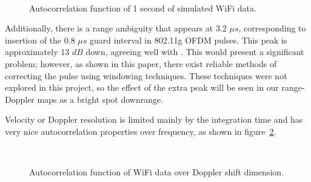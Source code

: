 \documentclass[article,11pt,onecolumn,final]{IEEEtran}
\begin{document}
\begin{figure}
	\caption{Autocorrelation function of 1 second of simulated WiFi data.}
	\centering
	\includegraphics[width=0.5]{figures/autocorr.png}
	\label{fig:autocorr}
\end{figure}

Additionally, there is a range ambiguity that appears at 3.2 $\mu s$, corresponding to insertion of the 0.8 $\mu s$ guard interval in 802.11g OFDM pulses. This peak is approximately 13 $dB$ down, agreeing well with \cite{Colone2012}. This would present a significant problem; however, as shown in this paper, there exist reliable methods of correcting the pulse using windowing techniques. These techniques were not explored in this project, so the effect of the extra peak will be seen in our range-Doppler maps as a bright spot downrange.

Velocity or Doppler resolution is limited mainly by the integration time and has very nice autocorrelation properties over frequency, as shown in figure~\ref{fig:autocorrdopp}.

\begin{figure}
	\caption{Autocorrelation function of WiFi data over Doppler shift dimension.}
	\centering
	\includegraphics[width=0.5]{figures/autocorrdopp.png}
	\label{fig:autocorrdopp}
\end{figure}
\end{document}
